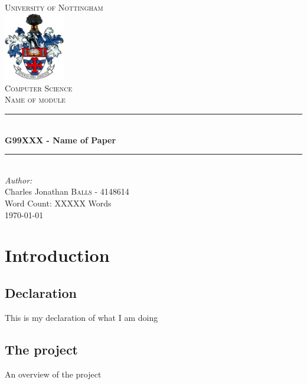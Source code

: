 \documentclass[12pt]{article}
\begin{document}
\begin{titlepage}

\newcommand{\HRule}{\rule{\linewidth}{0.5mm}}

\center %


\textsc{\LARGE University of Nottingham}\\[0.4cm] %
\includegraphics[width=100px]{nottinghamlogo.png}\\[1.0cm]
\textsc{\Large Computer Science}\\[0.3cm] %
\textsc{\large Name of module}\\[0.3cm] %


\HRule \\[0.4cm]
{ \huge \bfseries G99XXX - Name of Paper}\\[0.4cm] %
\HRule \\[1.0cm]


\Large \emph{Author:}\\
Charles Jonathan \textsc{Balls} - 4148614\\
Word Count: XXXXX Words\\
    [4cm] %


{\large \today}\\[2cm] %
\vfill %
\end{titlepage}


\section{Introduction}
\subsection{Declaration}
This is my declaration of what I am doing

\subsection{The project}
An overview of the project
\end{document}
